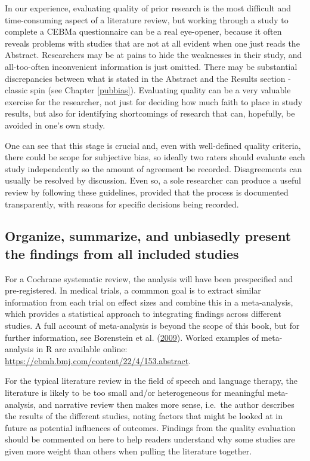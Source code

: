 \documentclass{krantz}
\begin{document}
In our experience, evaluating quality of prior research is the most difficult and time-consuming aspect of a literature review, but working through a study to complete a CEBMa questionnaire can be a real eye-opener, because it often reveals problems with studies that are not at all evident when one just reads the Abstract. Researchers may be at pains to hide the weaknesses in their study, and all-too-often inconvenient information is just omitted. There may be substantial discrepancies between what is stated in the Abstract and the Results section - classic spin (see Chapter \ref{pubbias}). Evaluating quality can be a very valuable exercise for the researcher, not just for deciding how much faith to place in study results, but also for identifying shortcomings of research that can, hopefully, be avoided in one's own study.

One can see that this stage is crucial and, even with well-defined quality criteria, there could be scope for subjective bias, so ideally two raters should evaluate each study independently so the amount of agreement be recorded. Disagreements can usually be resolved by discussion. Even so, a sole researcher can produce a useful review by following these guidelines, provided that the process is documented transparently, with reasons for specific decisions being recorded.

\hypertarget{organize-summarize-and-unbiasedly-present-the-findings-from-all-included-studies}{%
\subsection{Organize, summarize, and unbiasedly present the findings from all included studies}\label{organize-summarize-and-unbiasedly-present-the-findings-from-all-included-studies}}

For a Cochrane systematic review, the analysis will have been prespecified and pre-registered. In medical trials, a commmon goal is to extract similar information from each trial on effect sizes and combine this in a meta-analysis, which provides a statistical approach to integrating findings across different studies. A full account of meta-analysis is beyond the scope of this book, but for further information, see Borenstein et al. (\protect\hyperlink{ref-borenstein2009}{2009}). Worked examples of meta-analysis in R are available online: \url{https://ebmh.bmj.com/content/22/4/153.abstract}.

For the typical literature review in the field of speech and language therapy, the literature is likely to be too small and/or heterogeneous for meaningful meta-analysis, and narrative review then makes more sense, i.e.~the author describes the results of the different studies, noting factors that might be looked at in future as potential influences of outcomes. Findings from the quality evaluation should be commented on here to help readers understand why some studies are given more weight than others when pulling the literature together.
\end{document}
